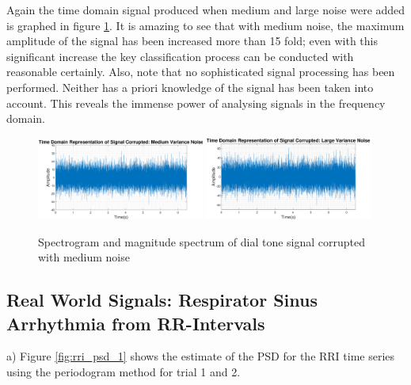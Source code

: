 \documentclass{article}
\begin{document}
Again the time domain signal produced when medium and large noise were added is graphed in figure \ref{fig:phone_num_medium_and_large_noise}. It is amazing to see that with medium noise, the maximum amplitude of the signal has been increased more than 15 fold; even with this significant increase the key classification process can be conducted with reasonable certainly. Also, note that no sophisticated signal processing has been performed. Neither has a priori knowledge of the signal has been taken into account. This reveals the immense power of analysing signals in the frequency domain. 

\begin{figure}[H]
    \centering
    \includegraphics[width=0.49\textwidth]{phone_num_medium_var}
    \includegraphics[width=0.49\textwidth]{phone_num_large_var}
    \caption{Spectrogram and magnitude spectrum of dial tone signal corrupted with medium noise}
    \label{fig:phone_num_medium_and_large_noise}
\end{figure}

\newpage
\subsection{Real World Signals: Respirator Sinus Arrhythmia from RR-Intervals}

a) Figure \ref{fig:rri_psd_1} shows the estimate of the PSD for the RRI time series using the periodogram method for trial 1 and 2. 
\end{document}
